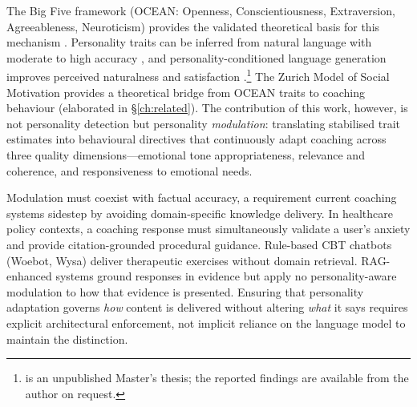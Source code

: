 \documentclass[10pt,a4paper]{report}
\begin{document}
The Big Five framework (OCEAN: Openness, Conscientiousness, Extraversion, Agreeableness, Neuroticism) provides the validated theoretical basis for this mechanism \citep{Costa1992, McCrae1992}. Personality traits can be inferred from natural language with moderate to high accuracy \citep{Yarkoni2010, Park2015}, and personality-conditioned language generation improves perceived naturalness and satisfaction \citep{Mairesse2010, Devdas2025}.\footnote{\citet{Devdas2025} is an unpublished Master's thesis; the reported findings are available from the author on request.} The Zurich Model of Social Motivation \citep{Quirin2022, Quirin2023} provides a theoretical bridge from OCEAN traits to coaching behaviour (elaborated in \S\ref{ch:related}). The contribution of this work, however, is not personality detection but personality \emph{modulation}: translating stabilised trait estimates into behavioural directives that continuously adapt coaching across three quality dimensions---emotional tone appropriateness, relevance and coherence, and responsiveness to emotional needs.

Modulation must coexist with factual accuracy, a requirement current coaching systems sidestep by avoiding domain-specific knowledge delivery. In healthcare policy contexts, a coaching response must simultaneously validate a user's anxiety and provide citation-grounded procedural guidance. Rule-based CBT chatbots (Woebot, Wysa) deliver therapeutic exercises without domain retrieval. RAG-enhanced systems ground responses in evidence but apply no personality-aware modulation to how that evidence is presented. Ensuring that personality adaptation governs \emph{how} content is delivered without altering \emph{what} it says requires explicit architectural enforcement, not implicit reliance on the language model to maintain the distinction.
\end{document}

